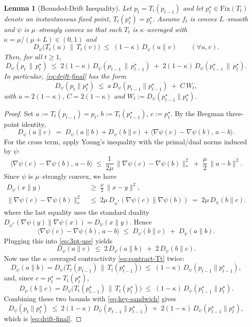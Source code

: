\documentclass[11pt]{article}
\theoremstyle{plain}
\newtheorem{lemma}[theorem]{Lemma}
\theoremstyle{definition}
\theoremstyle{remark}
\begin{document}
\begin{lemma}[Bounded-Drift Inequality]
\label{lem:drift}
Let $p_t=T_t(p_{t-1})$ and let $p_t^\star \in \mathrm{Fix}(T_t)$ denote an instantaneous fixed point, $T_t(p_t^\star)=p_t^\star$. 
Assume $f_t$ is convex $L$--smooth and $\psi$ is $\mu$--strongly convex so that each $T_t$ is $\kappa$--averaged with $\kappa=\mu/(\mu+L)\in(0,1)$ and
\begin{equation}\label{eq:contract-Tt}
D_\psi\big(T_t(u)\,\big\|\,T_t(v)\big)\;\le\;(1-\kappa)\,D_\psi(u\|v)\qquad(\forall u,v).
\end{equation}
Then, for all $t\ge1$,
\begin{equation}\label{eq:drift-final}
D_\psi(p_t\,\|\,p_t^\star)\;\le\;2(1-\kappa)\,D_\psi(p_{t-1}\,\|\,p_{t-1}^\star)\;+\;2(1-\kappa)\,D_\psi(p_{t-1}^\star\,\|\,p_t^\star).
\end{equation}
In particular, \eqref{eq:drift-final} has the form
\[
D_\psi(p_t\|p_t^\star)\;\le\;a\,D_\psi(p_{t-1}\|p_{t-1}^\star)\;+\;C\,W_t,
\]
with $a=2(1-\kappa)$, $C=2(1-\kappa)$ and $W_t:=D_\psi(p_{t-1}^\star\|p_t^\star)$.
\end{lemma}

\begin{proof}
Set $a:=T_t(p_{t-1})=p_t$, $b:=T_t(p_{t-1}^\star)$, $c:=p_t^\star$. 
By the Bregman three-point identity,
\begin{equation}\label{eq:3pt-use}
D_\psi(a\|c)\;=\;D_\psi(a\|b)+D_\psi(b\|c)+\langle\nabla\psi(c)-\nabla\psi(b),\,a-b\rangle.
\end{equation}
For the cross term, apply Young's inequality with the primal/dual norms induced by $\psi$:
\[
\langle\nabla\psi(c)-\nabla\psi(b),\,a-b\rangle
\;\le\;
\frac{1}{2\mu}\,\|\nabla\psi(c)-\nabla\psi(b)\|_*^2\;+\;\frac{\mu}{2}\,\|a-b\|^2.
\]
Since $\psi$ is $\mu$--strongly convex, we have
\begin{align}
D_\psi(x\|y)
&\;\ge\;\tfrac{\mu}{2}\,\|x-y\|^2, \nonumber\\[4pt]
\|\nabla\psi(c)-\nabla\psi(b)\|_*^2
&\;\le\;2\mu\,D_{\psi^*}(\nabla\psi(c)\|\nabla\psi(b))
\;=\;2\mu\,D_\psi(b\|c).
\label{eq:bregman-strongconvex}
\end{align}
where the last equality uses the standard duality $D_{\psi^*}(\nabla\psi(y)\|\nabla\psi(x))=D_\psi(x\|y)$. Hence
\[
\langle\nabla\psi(c)-\nabla\psi(b),\,a-b\rangle
\;\le\; D_\psi(b\|c)\;+\;D_\psi(a\|b).
\]
Plugging this into \eqref{eq:3pt-use} yields
\begin{equation}\label{eq:key-sandwich}
D_\psi(a\|c)\;\le\;2\,D_\psi(a\|b)\;+\;2\,D_\psi(b\|c).
\end{equation}
Now use the $\kappa$–averaged contractivity \eqref{eq:contract-Tt} twice:
\[
D_\psi(a\|b)=D_\psi\!\big(T_t(p_{t-1})\,\big\|\,T_t(p_{t-1}^\star)\big)
\;\le\;(1-\kappa)\,D_\psi(p_{t-1}\|p_{t-1}^\star),
\]
and, since $c=p_t^\star=T_t(p_t^\star)$,
\[
D_\psi(b\|c)=D_\psi\!\big(T_t(p_{t-1}^\star)\,\big\|\,T_t(p_t^\star)\big)
\;\le\;(1-\kappa)\,D_\psi(p_{t-1}^\star\|p_t^\star).
\]
Combining these two bounds with \eqref{eq:key-sandwich} gives
\[
D_\psi(p_t\|p_t^\star)\;\le\;2(1-\kappa)\,D_\psi(p_{t-1}\|p_{t-1}^\star)\;+\;2(1-\kappa)\,D_\psi(p_{t-1}^\star\|p_t^\star),
\]
which is \eqref{eq:drift-final}.
\end{proof}
\end{document}
